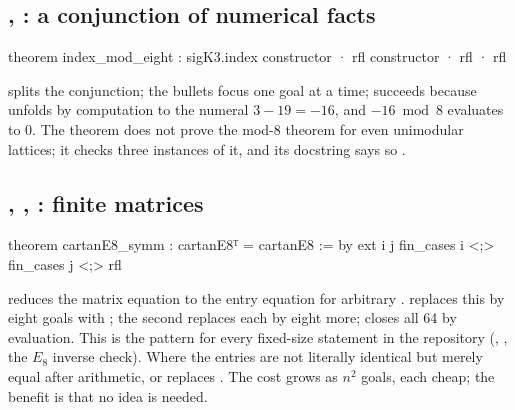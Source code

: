\subsection{, : a conjunction of numerical facts}
\begin{leancode}
theorem index_mod_eight :
    sigK3.index %
  constructor
  · rfl
  constructor
  · rfl
  · rfl
\end{leancode}
 splits the conjunction; the bullets  focus one goal at a time;
 succeeds because  unfolds by computation to the numeral
$3-19=-16$, and $-16 \bmod 8$ evaluates to $0$. The theorem does not prove the mod-8
theorem for even unimodular lattices; it checks three instances of it, and its docstring
says so .

\subsection{, , : finite matrices}
\begin{leancode}
theorem cartanE8_symm : cartanE8ᵀ = cartanE8 := by
  ext i j
  fin_cases i <;> fin_cases j <;> rfl
\end{leancode}
 reduces the matrix equation to the entry equation
 for arbitrary . 
replaces this by eight goals with ; the second 
replaces each by eight more;  closes all 64 by evaluation. This is the pattern
for every fixed-size statement in the repository (,
, the $E_8$ inverse check). Where the entries are not literally
identical but merely equal after arithmetic,  or  replaces
. The cost grows as $n^2$ goals, each cheap; the benefit is that no idea is
needed.

